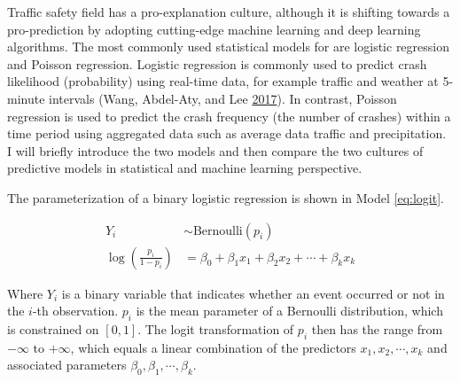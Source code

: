 \documentclass[12pt]{book}
\numberwithin{equation}{chapter}
\begin{document}
Traffic safety field has a pro-explanation culture, although it is shifting towards a pro-prediction by adopting cutting-edge machine learning and deep learning algorithms. The most commonly used statistical models for are logistic regression and Poisson regression. Logistic regression is commonly used to predict crash likelihood (probability) using real-time data, for example traffic and weather at 5-minute intervals (Wang, Abdel-Aty, and Lee \protect\hyperlink{ref-wang2017safety}{2017}). In contrast, Poisson regression is used to predict the crash frequency (the number of crashes) within a time period using aggregated data such as average data traffic and precipitation. I will briefly introduce the two models and then compare the two cultures of predictive models in statistical and machine learning perspective.

The parameterization of a binary logistic regression is shown in Model \eqref{eq:logit}.

\begin{equation}
\begin{split}
Y_i & \sim \text{Bernoulli}(p_i) \\
\log(\frac{p_i}{1 - p_i}) & = \beta_0 + \beta_1x_1 + \beta_2x_2 + \cdots + \beta_kx_k
\label{eq:logit}
\end{split}
\end{equation}

Where \(Y_i\) is a binary variable that indicates whether an event occurred or not in the \(i\)-th observation. \(p_i\) is the mean parameter of a Bernoulli distribution, which is constrained on \([0, 1]\). The logit transformation of \(p_i\) then has the range from \(-\infty\) to \(+\infty\), which equals a linear combination of the predictors \(x_1, x_2, \cdots, x_k\) and associated parameters \(\beta_0, \beta_1, \cdots, \beta_k\).
\end{document}
